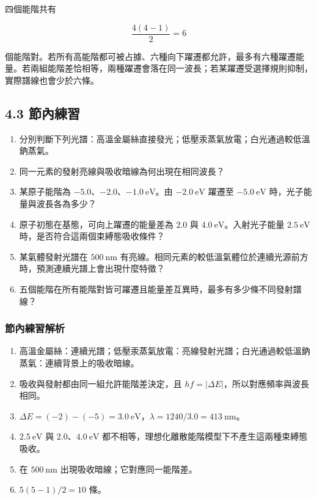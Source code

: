 \documentclass[11pt,a4paper]{article}
\providecommand{\tightlist}{%
  \setlength{\itemsep}{0pt}\setlength{\parskip}{0pt}}
\begin{document}
四個能階共有

\[
\frac{4(4-1)}2=6
\]

個能階對。若所有高能階都可被占據、六種向下躍遷都允許，最多有六種躍遷能量。若兩組能階差恰相等，兩種躍遷會落在同一波長；若某躍遷受選擇規則抑制，實際譜線也會少於六條。

\subsection{4.3 節內練習}\label{ux7bc0ux5167ux7df4ux7fd2-3}

\begin{enumerate}
\def\labelenumi{\arabic{enumi}.}
\tightlist
\item
  分別判斷下列光譜：高溫金屬絲直接發光；低壓汞蒸氣放電；白光通過較低溫鈉蒸氣。
\item
  同一元素的發射亮線與吸收暗線為何出現在相同波長？
\item
  某原子能階為 \(-5.0\)、\(-2.0\)、\(-1.0\ \mathrm{eV}\)。由 \(-2.0\ \mathrm{eV}\) 躍遷至 \(-5.0\ \mathrm{eV}\) 時，光子能量與波長各為多少？
\item
  原子初態在基態，可向上躍遷的能量差為 \(2.0\) 與 \(4.0\ \mathrm{eV}\)。入射光子能量 \(2.5\ \mathrm{eV}\) 時，是否符合這兩個束縛態吸收條件？
\item
  某氣體發射光譜在 \(500\ \mathrm{nm}\) 有亮線。相同元素的較低溫氣體位於連續光源前方時，預測連續光譜上會出現什麼特徵？
\item
  五個能階在所有能階對皆可躍遷且能量差互異時，最多有多少條不同發射譜線？
\end{enumerate}

\subsubsection{節內練習解析}\label{ux7bc0ux5167ux7df4ux7fd2ux89e3ux6790-3}

\begin{enumerate}
\def\labelenumi{\arabic{enumi}.}
\tightlist
\item
  高溫金屬絲：連續光譜；低壓汞蒸氣放電：亮線發射光譜；白光通過較低溫鈉蒸氣：連續背景上的吸收暗線。
\item
  吸收與發射都由同一組允許能階差決定，且 \(hf=\lvert\Delta E\rvert\)，所以對應頻率與波長相同。
\item
  \(\Delta E=(-2)-(-5)=3.0\ \mathrm{eV}\)，\(\lambda=1240/3.0=413\ \mathrm{nm}\)。
\item
  \(2.5\ \mathrm{eV}\) 與 \(2.0\)、\(4.0\ \mathrm{eV}\) 都不相等，理想化離散能階模型下不產生這兩種束縛態吸收。
\item
  在 \(500\ \mathrm{nm}\) 出現吸收暗線；它對應同一能階差。
\item
  \(5(5-1)/2=10\) 條。
\end{enumerate}
\end{document}
